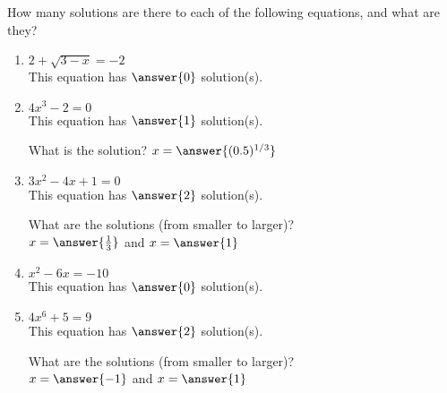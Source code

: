 \documentclass{ximera}
\author{Elizabeth Campolongo}
\begin{document}
How many solutions are there to each of the following equations, and what are they?
\begin{enumerate}
\item
\begin{exercise}
 $2+\sqrt{3-x}=-2$ \\
This equation has $\answer{0}$ solution(s).
\end{exercise}
%
\item 
\begin{exercise}
$4x^3-2=0$ \\
This equation has $\answer{1}$ solution(s).
%
\begin{exercise}
What is the solution?
$x=\answer{(0.5)^{1/3}}$
\end{exercise}
\end{exercise}
\item 
\begin{exercise}
$3x^2-4x+1=0$ \\
This equation has $\answer{2}$ solution(s).
\begin{exercise}
What are the solutions (from smaller to larger)?\\
$x=\answer{\frac{1}{3}}$ and $x=\answer{1}$
\end{exercise}
\end{exercise}


\item 
\begin{exercise}
$x^2-6x=-10$ \\
This equation has $\answer{0}$ solution(s).
\end{exercise}


\item 
\begin{exercise}
$4x^6+5=9$ \\
This equation has $\answer{2}$ solution(s).
\begin{exercise}
What are the solutions (from smaller to larger)?\\
$x=\answer{-1}$ and $x=\answer{1}$
\end{exercise}
\end{exercise}


\end{enumerate}
\end{document}
